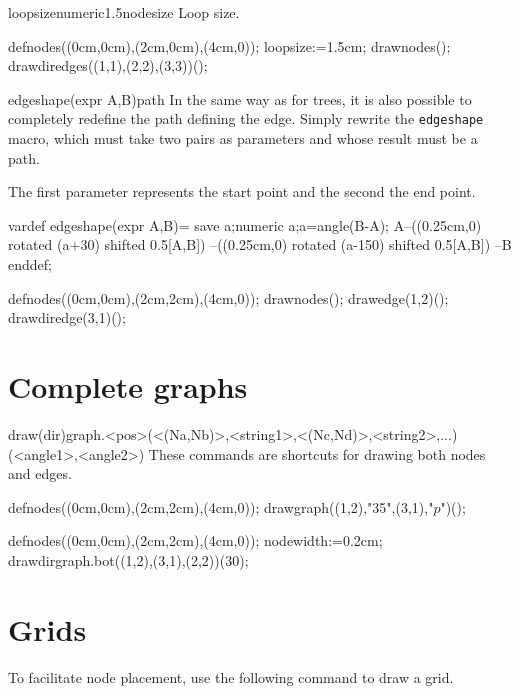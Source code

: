 \documentclass[11pt,a4paper,english]{article}
\begin{document}
\begin{mptparam}{loopsize}{numeric}{1.5nodesize}
Loop size.
\end{mptparam}

\begin{exemple}[lefthand ratio = 0.6]
defnodes((0cm,0cm),(2cm,0cm),(4cm,0));
loopsize:=1.5cm;
drawnodes();
drawdiredges((1,1),(2,2),(3,3))();
\end{exemple}

\begin{rpobjet}{edgeshape(expr A,B)}{path}
In the same way as for trees, it is also possible to completely redefine the path defining the edge. Simply rewrite the \verb|edgeshape| macro, which must take two pairs as parameters and whose result must be a path.

The first parameter represents the start point and the second the end point.

\end{rpobjet}

\begin{exemple}[lefthand ratio = 0.6]
vardef edgeshape(expr A,B)=
 save a;numeric a;a=angle(B-A);
 A--((0.25cm,0) rotated (a+30) shifted 0.5[A,B])
  --((0.25cm,0) rotated (a-150) shifted 0.5[A,B])
  --B
enddef;

defnodes((0cm,0cm),(2cm,2cm),(4cm,0));
drawnodes();
drawedge(1,2)();
drawdiredge(3,1)();
\end{exemple}


\section{Complete graphs}

\begin{rplabel}{draw(dir)graph.<pos>(<(Na,Nb)>,<string1>,<(Nc,Nd)>,<string2>,...)(<angle1>,<angle2>)}
These commands are shortcuts for drawing both nodes and edges.
\end{rplabel}


\begin{exemple}[lefthand ratio = 0.6]
defnodes((0cm,0cm),(2cm,2cm),(4cm,0));
drawgraph((1,2),"35",(3,1),"$p$")();
\end{exemple}

\begin{exemple}[lefthand ratio = 0.6]
defnodes((0cm,0cm),(2cm,2cm),(4cm,0));
nodewidth:=0.2cm;
drawdirgraph.bot((1,2),(3,1),(2,2))(30);
\end{exemple}


\section{Grids}
To facilitate node placement, use the following command to draw a grid.
\end{document}
